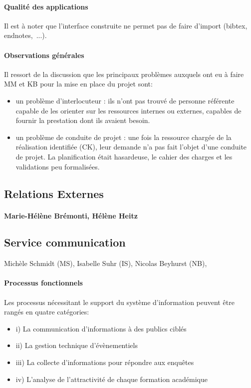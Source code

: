 \documentclass{book}
\begin{document}
\paragraph{Qualité des applications}
Il est à noter que l'interface construite ne permet pas de faire d'import (bibtex, 
endnotes,~...). 


\paragraph{Observations générales}
Il ressort de la discussion que les principaux problèmes auxquels ont eu à 
faire MM et KB pour la mise en place du projet sont:
\begin{itemize}
\item un problème d'interlocuteur : ils n'ont pas trouvé de personne référente 
capable de les orienter sur les ressources internes ou externes, capables de fournir 
la prestation dont ils avaient besoin.
\item un problème de conduite de projet : une fois la ressource chargée de la 
réalisation identifiée (CK), leur demande n'a pas fait l'objet d'une conduite
de projet. La planification était hasardeuse, le cahier des charges et
les validations peu formalisées.
\end{itemize}




\subsection{Relations Externes}
\paragraph{Marie-Hélène Brémonti, Hélène Heitz}

\subsection{Service communication}
Michèle Schmidt (MS), Isabelle Suhr (IS), Nicolas Beyhurst (NB),

\paragraph{Processus fonctionnels}
Les processus nécessitant le support du système d'information peuvent 
être rangés en quatre catégories:
\begin{itemize}
\item i) La communication d'informations à des publics ciblés
\item ii) La gestion technique d'évènementiels 
\item iii) La collecte d'informations pour répondre aux enquêtes
\item iv) L'analyse de l'attractivité de chaque formation académique
\end{itemize}
\end{document}

